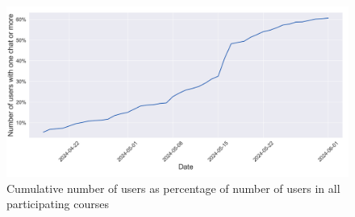 \begin{figure}[H]
    \centering
    \includegraphics[width=\textwidth]{results/plots/assets/usage-06-number-of-sessions-per-day.png}
    \caption{Cumulative number of users as percentage of number of users in all participating courses}
    \label{fig:usage_06_number_of_sessions_per_day}
\end{figure}